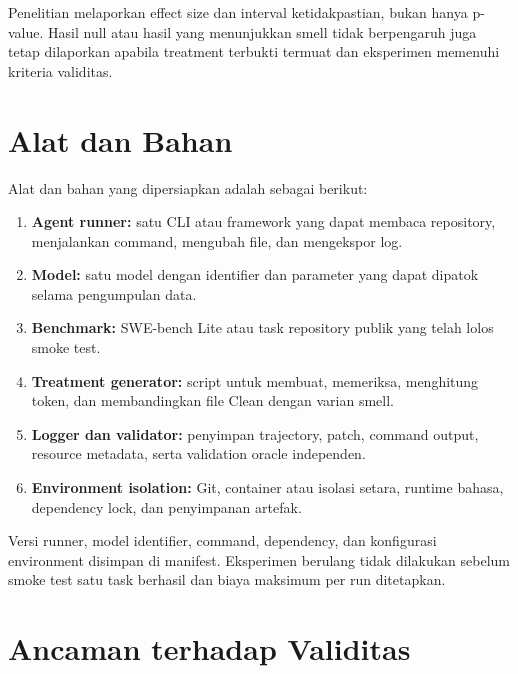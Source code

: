 Penelitian melaporkan effect size dan interval ketidakpastian, bukan hanya p-value. Hasil null atau hasil yang menunjukkan smell tidak berpengaruh juga tetap dilaporkan apabila treatment terbukti termuat dan eksperimen memenuhi kriteria validitas.

\section{Alat dan Bahan}

Alat dan bahan yang dipersiapkan adalah sebagai berikut:

\begin{enumerate}[leftmargin=*]
    \item \textbf{Agent runner:} satu CLI atau framework yang dapat membaca repository, menjalankan command, mengubah file, dan mengekspor log.
    \item \textbf{Model:} satu model dengan identifier dan parameter yang dapat dipatok selama pengumpulan data.
    \item \textbf{Benchmark:} SWE-bench Lite atau task repository publik yang telah lolos smoke test.
    \item \textbf{Treatment generator:} script untuk membuat, memeriksa, menghitung token, dan membandingkan file Clean dengan varian smell.
    \item \textbf{Logger dan validator:} penyimpan trajectory, patch, command output, resource metadata, serta validation oracle independen.
    \item \textbf{Environment isolation:} Git, container atau isolasi setara, runtime bahasa, dependency lock, dan penyimpanan artefak.
\end{enumerate}

Versi runner, model identifier, command, dependency, dan konfigurasi environment disimpan di manifest. Eksperimen berulang tidak dilakukan sebelum smoke test satu task berhasil dan biaya maksimum per run ditetapkan.

\section{Ancaman terhadap Validitas}

